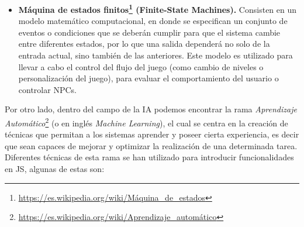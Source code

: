 \begin{itemize}
	\item \textbf{Máquina de estados finitos\footnote{\url{https://es.wikipedia.org/wiki/Máquina\_de\_estados}} (Finite-State Machines).} Consisten en un modelo matemático computacional, en donde se especifican un conjunto de eventos o condiciones que se deberán cumplir para que el sistema cambie entre diferentes estados, por lo que una salida dependerá no solo de la entrada actual, sino también de las anteriores. Este modelo es utilizado para llevar a cabo el control del flujo del juego (como cambio de niveles o personalización del juego), para evaluar el comportamiento del usuario o controlar NPCs.
\end{itemize}

Por otro lado, dentro del campo de la IA podemos encontrar la rama \emph{Aprendizaje Automático}\footnote{\url{https://es.wikipedia.org/wiki/Aprendizaje\_automático}} (o en inglés \emph{Machine Learning}), el cual se centra en la creación de técnicas que permitan a los sistemas aprender y poseer cierta experiencia, es decir que sean capaces de mejorar y optimizar la realización de una determinada tarea. Diferentes técnicas de esta rama se han utilizado para introducir funcionalidades en JS, algunas de estas son:


